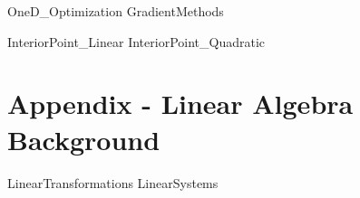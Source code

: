 \documentclass[letter,12pt]{book}
\renewcommand{\0}{\mathbf{0}}
\begin{document}
{OneD_Optimization}
{GradientMethods}

{InteriorPoint_Linear}
{InteriorPoint_Quadratic}





%
%
%
%
%
%
%

\appendix
\part{Appendix - Linear Algebra Background}
{LinearTransformations} %
{LinearSystems}



\end{document}
